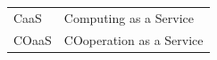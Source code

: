\begin{longtable}[l]{l l}
CaaS   & Computing as a Service                            \\
COaaS  & COoperation as a Service                           \\
\end{longtable}